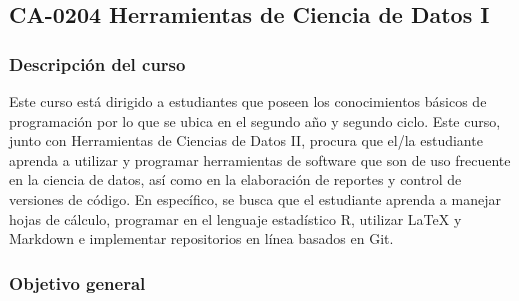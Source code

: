 \newpage
\subsection*{CA-0204 Herramientas de Ciencia de Datos I}

\hypertarget{CA0203}{}
\begin{refsection}
\begin{table}[H]
\end{table}

\subsubsection*{Descripción del curso}

Este curso está dirigido a estudiantes que poseen los conocimientos básicos de programación por lo que se ubica en el segundo año y segundo ciclo. Este curso, junto con Herramientas de Ciencias de Datos II, procura que el/la estudiante aprenda a utilizar y programar herramientas de software que son de uso frecuente en la ciencia de datos, así como en la elaboración de reportes y control de versiones de código. En específico, se busca que el estudiante aprenda a manejar hojas de cálculo, programar en el lenguaje estadístico R, utilizar \LaTeX{} y Markdown e implementar repositorios en línea basados en Git.

\subsubsection*{Objetivo general}


\end{refsection}
